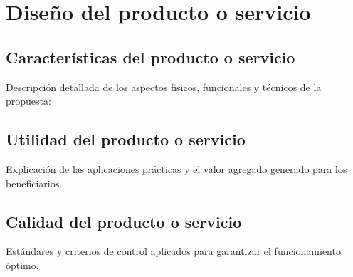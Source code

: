 \section{Diseño del producto o servicio}
\label{sec:diseno}

\subsection{Características del producto o servicio}
Descripción detallada de los aspectos físicos, funcionales y técnicos de la propuesta:





\subsection{Utilidad del producto o servicio}
Explicación de las aplicaciones prácticas y el valor agregado generado para los beneficiarios.

\subsection{Calidad del producto o servicio}
Estándares y criterios de control aplicados para garantizar el funcionamiento óptimo.

